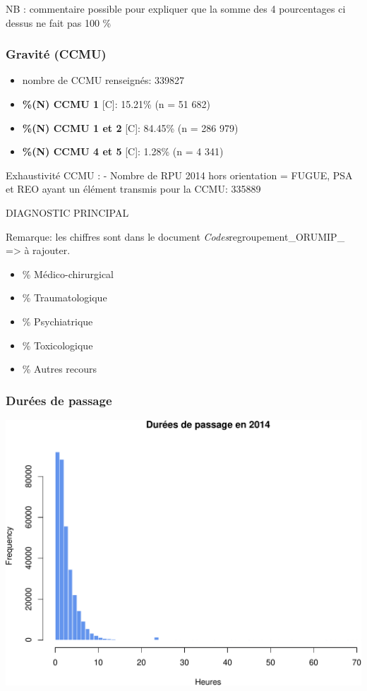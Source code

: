 \documentclass[]{article}
\begin{document}
NB : commentaire possible pour expliquer que la somme des 4 pourcentages
ci dessus ne fait pas 100 \%

\subsubsection{Gravité (CCMU)}\label{gravite-ccmu}

\begin{itemize}
\itemsep1pt\parskip0pt
\item
  nombre de CCMU renseignés: 339827
\item
  \textbf{\%(N) CCMU 1 } {[}C{]}: 15.21\% (n = 51 682)
\item
  \textbf{\%(N) CCMU 1 et 2} {[}C{]}: 84.45\% (n = 286 979)
\item
  \textbf{\%(N) CCMU 4 et 5} {[}C{]}: 1.28\% (n = 4 341)
\end{itemize}

Exhaustivité CCMU : - Nombre de RPU 2014 hors orientation = FUGUE, PSA
et REO ayant un élément transmis pour la CCMU: 335889

DIAGNOSTIC PRINCIPAL

Remarque: les chiffres sont dans le document
\emph{Codes}regroupement\_ORUMIP\_ =\textgreater{} à rajouter.

\begin{itemize}
\itemsep1pt\parskip0pt
\item
  \% Médico-chirurgical
\item
  \% Traumatologique
\item
  \% Psychiatrique
\item
  \% Toxicologique
\item
  \% Autres recours
\end{itemize}

\subsubsection{Durées de passage}\label{durees-de-passage}

\includegraphics{rapport2014_V4_files/figure-latex/passages-1.pdf}
\end{document}
